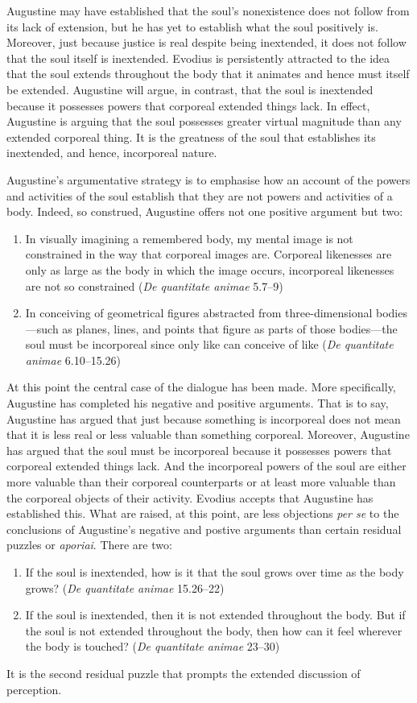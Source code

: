 \documentclass[12pt]{article}
\begin{document}
Augustine may have established that the soul’s nonexistence does not follow from its lack of extension, but he has yet to establish what the soul positively is. Moreover, just because justice is real despite being inextended, it does not follow that the soul itself is inextended. Evodius is persistently attracted to the idea that the soul extends throughout the body that it animates and hence must itself be extended. Augustine will argue, in contrast, that the soul is inextended because it possesses powers that corporeal extended things lack. In effect, Augustine is arguing that the soul possesses greater virtual magnitude than any extended corporeal thing. It is the greatness of the soul that establishes its inextended, and hence, incorporeal nature.

Augustine’s argumentative strategy is to emphasise how an account of the powers and activities of the soul establish that they are not powers and activities of a body. Indeed, so construed, Augustine offers not one positive argument but two:
\begin{enumerate}[(1)]
	\item In visually imagining a remembered body, my mental image is not constrained in the way that corporeal images are. Corporeal likenesses are only as large as the body in which the image occurs, incorporeal likenesses are not so constrained (\emph{De quantitate animae} 5.7–9)
	\item In conceiving of geometrical figures abstracted from three-dimensional bodies—such as planes, lines, and points that figure as parts of those bodies—the soul must be incorporeal since only like can conceive of like (\emph{De quantitate animae} 6.10–15.26)
\end{enumerate}

At this point the central case of the dialogue has been made. More specifically, Augustine has completed his negative and positive arguments. That is to say, Augustine has argued that just because something is incorporeal does not mean that it is less real or less valuable than something corporeal. Moreover, Augustine has argued that the soul must be incorporeal because it possesses powers that corporeal extended things lack. And the incorporeal powers of the soul are either more valuable than their corporeal counterparts or at least more valuable than the corporeal objects of their activity. Evodius accepts that Augustine has established this. What are raised, at this point, are less objections \emph{per se} to the conclusions of Augustine's negative and postive arguments than certain residual puzzles or \emph{aporiai}. There are two:
\begin{enumerate}[(1)]
	\item If the soul is inextended, how is it that the soul grows over time as the body grows? (\emph{De quantitate animae} 15.26–22)
	\item If the soul is inextended, then it is not extended throughout the body. But if the soul is not extended throughout the body, then how can it feel wherever the body is touched? (\emph{De quantitate animae} 23–30)
\end{enumerate}
It is the second residual puzzle that prompts the extended discussion of perception.
	
\end{document}
